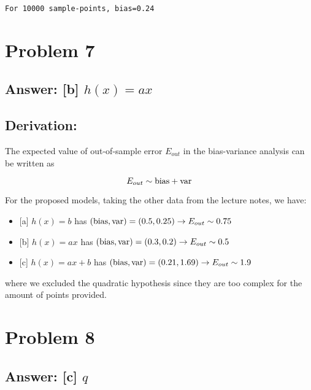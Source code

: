 \documentclass[11pt]{article}
\providecommand{\tightlist}{%
      \setlength{\itemsep}{0pt}\setlength{\parskip}{0pt}}
\begin{document}
    \begin{Verbatim}[commandchars=\\\{\}]
For 10000 sample-points, bias=0.24
    \end{Verbatim}

    \hypertarget{problem-7}{%
\section{Problem 7}\label{problem-7}}

\hypertarget{answer-b-hxax}{%
\subsection{\texorpdfstring{Answer: {[}b{]}
\(h(x)=ax\)}{Answer: {[}b{]} h(x)=ax}}\label{answer-b-hxax}}

\hypertarget{derivation}{%
\subsection{Derivation:}\label{derivation}}

The expected value of out-of-sample error \(E_{out}\) in the
bias-variance analysis can be written as

\[
E_{out}\sim{\rm bias}+{\rm var}
\]

For the proposed models, taking the other data from the lecture notes,
we have:

\begin{itemize}
\tightlist
\item
  {[}a{]} \(h(x)=b\) has
  \(({\rm bias},{\rm var})=(0.5,0.25)\rightarrow E_{out}\sim 0.75\)
\item
  {[}b{]} \(h(x)=ax\) has
  \(({\rm bias},{\rm var})=(0.3,0.2)\rightarrow E_{out}\sim 0.5\)
\item
  {[}c{]} \(h(x)=ax+b\) has
  \(({\rm bias},{\rm var})=(0.21,1.69)\rightarrow E_{out}\sim 1.9\)
\end{itemize}

where we excluded the quadratic hypothesis since they are too complex
for the amount of points provided.

    \hypertarget{problem-8}{%
\section{Problem 8}\label{problem-8}}

\hypertarget{answer-c-q}{%
\subsection{\texorpdfstring{Answer: {[}c{]}
\(q\)}{Answer: {[}c{]} q}}\label{answer-c-q}}
\end{document}
